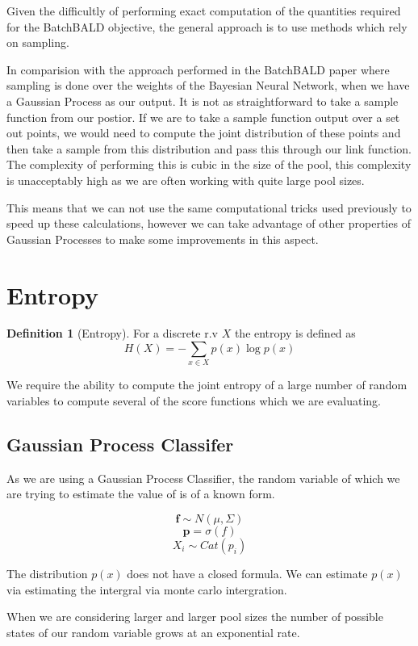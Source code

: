 \documentclass[12pt, a4paper]{report}
\theoremstyle{definition}
\newtheorem{definition}{Definition}[section]
\begin{document}
Given the difficultly of performing exact computation of the quantities required for the BatchBALD objective, the general approach is to use methods which rely on sampling.

In comparision with the approach performed in the BatchBALD paper where sampling is done over the weights of the Bayesian Neural Network, when we have a Gaussian Process as our output. It is not as straightforward to take a sample function from our postior. If we are to take a sample function output over a set out points, we would need to compute the joint distribution of these points and then take a sample from this distribution and pass this through our link function.
The complexity of performing this is cubic in the size of the pool, this complexity is unacceptably high as we are often working with quite large pool sizes.

This means that we can not use the same computational tricks used previously to speed up these calculations, however we can take advantage of other properties of Gaussian Processes to make some improvements in this aspect.


\section{Entropy}
\label{sec:Entropy}

\begin{definition}[Entropy]
    For a discrete r.v $X$ the entropy is defined as $$H(X) = - \sum_{x \in X} p(x) \log p(x) $$
\end{definition}


We require the ability to compute the joint entropy of a large number of random variables to compute several of the score functions which we are evaluating.

\subsection{Gaussian Process Classifer}
As we are using a Gaussian Process Classifier, the random variable of which we are trying to estimate the value of is of a known form.


$$ \mathbf{f} \sim N(\mu, \Sigma) $$
$$ \mathbf{p} =  \sigma \left(f \right) $$
$$ X_i \sim Cat(p_i) $$

The distribution $p(x)$ does not have a closed formula. We can estimate $p(x)$ via estimating the intergral via monte carlo intergration.

When we are considering larger and larger pool sizes the number of possible states of our random variable grows at an exponential rate.
\end{document}
